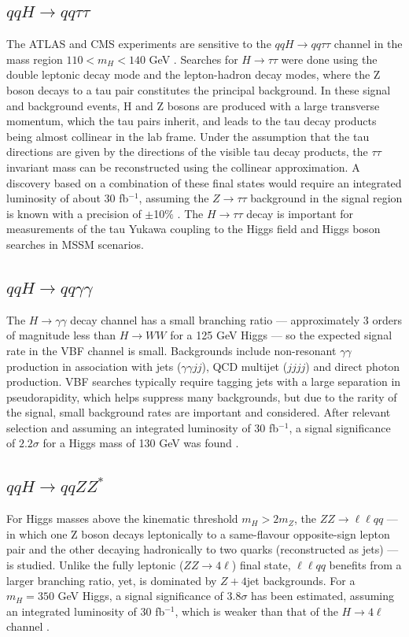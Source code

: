 \documentclass[a4paper,11pt]{article}
\begin{document}
\subsection{$qqH \rightarrow qq\tau \tau $}
The ATLAS and CMS experiments are sensitive to the $qqH \rightarrow qq \tau \tau$ channel in the mass region $110 < m_H <140$ GeV \cite{Buescher:2005re}. Searches for $H\rightarrow \tau \tau$ were done using the double leptonic decay mode and the lepton-hadron decay modes, where the Z boson decays to a tau pair constitutes the principal background. In these signal and background events, H and Z bosons are produced with a large transverse momentum, which the tau pairs inherit, and leads to the tau decay products being almost collinear in the lab frame. Under the assumption that the tau directions are given by the directions of the visible tau decay products, the $\tau \tau$ invariant mass can be reconstructed using the collinear approximation. A discovery based on a combination of these final states would require an integrated luminosity of about 30 fb$^{-1}$, assuming the $Z \rightarrow \tau \tau $ background in the signal region is known with a precision of $\pm$10$\%$ \cite{Buescher:2005re}. The $H \rightarrow \tau \tau$ decay is important for measurements of the tau Yukawa coupling to the Higgs field and Higgs boson searches in MSSM scenarios.


\subsection{$qqH \rightarrow qq\gamma \gamma$}
The $H \rightarrow \gamma \gamma $  decay channel has a small branching ratio --- approximately 3 orders of magnitude less than $H \rightarrow WW$ for a 125 GeV Higgs --- so the expected signal rate in the VBF channel is small. Backgrounds include non-resonant $\gamma \gamma$ production in association with jets ($\gamma \gamma j j$), QCD multijet ($jjjj$) and direct photon production. VBF searches typically require tagging jets with a large separation in pseudorapidity, which helps suppress many backgrounds, but due to the rarity of the signal, small background rates are important and considered. After relevant selection and assuming an integrated luminosity of 30 fb$^{-1}$, a signal significance of $2.2 \sigma$ for a Higgs mass of 130 GeV was found \cite{Buescher:2005re}.

\subsection{$qqH \rightarrow qqZZ^{*}$}
For Higgs masses above the kinematic threshold  $m_H > 2m_Z$, the $ZZ \rightarrow \ell \ell qq$ --- in which one Z boson decays leptonically to a same-flavour opposite-sign lepton pair and the other decaying hadronically to two quarks (reconstructed as jets) ---  is studied. Unlike the fully leptonic ($ZZ \rightarrow 4 \ell$) final state, $\ell \ell qq$ benefits from a larger branching ratio, yet, is dominated by $Z+4$jet backgrounds. For a $m_H = 350$ GeV Higgs, a signal significance of $3.8 \sigma$ has been estimated, assuming an integrated luminosity of 30 fb$^{-1}$, which is weaker than that of the $H \rightarrow 4 \ell$ channel \cite{Buescher:2005re}. 
\end{document}
